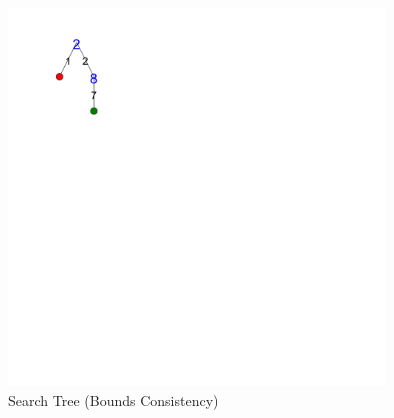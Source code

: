 \begin{frame}
{}
\end{frame}

\begin{figure}[ht]
\caption{\label{sudoku:searchtreebc}Search Tree (Bounds Consistency)}
\begin{center}
\includegraphics[width=10cm]{../sudoku/BC/tree_expanded_4}
\end{center}
\end{figure}


